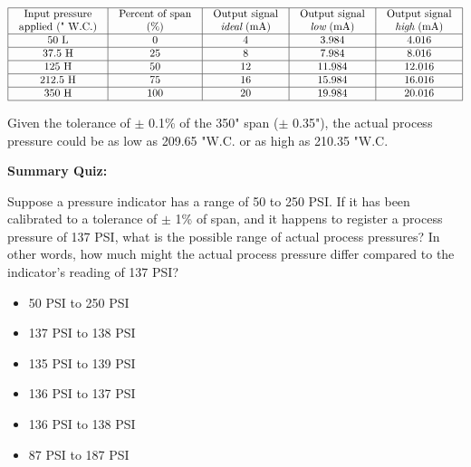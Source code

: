 






$$\vbox{\offinterlineskip
\halign{\strut
\vrule \quad\hfil # \ \hfil & 
\vrule \quad\hfil # \ \hfil & 
\vrule \quad\hfil # \ \hfil & 
\vrule \quad\hfil # \ \hfil & 
\vrule \quad\hfil # \ \hfil \vrule \cr
\noalign{\hrule}
%
Input pressure & Percent of span & Output signal & Output signal & Output signal \cr
%
applied (" W.C.) & (\%) & {\it ideal} (mA) & {\it low} (mA) & {\it high} (mA) \cr
%
\noalign{\hrule}
%
50 L & 0 & 4 & 3.984 & 4.016 \cr
%
\noalign{\hrule}
%
37.5 H & 25 & 8 & 7.984 & 8.016 \cr
%
\noalign{\hrule}
%
125 H & 50 & 12 & 11.984 & 12.016 \cr
%
\noalign{\hrule}
%
212.5 H & 75 & 16 & 15.984 & 16.016 \cr
%
\noalign{\hrule}
%
350 H & 100 & 20 & 19.984 & 20.016 \cr
%
\noalign{\hrule}
} %
}$$ %


Given the tolerance of $\pm$ 0.1\% of the 350" span ($\pm$ 0.35"), the actual process pressure could be as low as 209.65 "W.C. or as high as 210.35 "W.C.














\vfil \eject

\noindent
{\bf Summary Quiz:}

Suppose a pressure indicator has a range of 50 to 250 PSI.  If it has been calibrated to a tolerance of $\pm$ 1\% of span, and it happens to register a process pressure of 137 PSI, what is the possible range of actual process pressures?  In other words, how much might the actual process pressure differ compared to the indicator's reading of 137 PSI?

\begin{itemize}
\item{} 50 PSI to 250 PSI
\vskip 5pt 
\item{} 137 PSI to 138 PSI
\vskip 5pt 
\item{} 135 PSI to 139 PSI
\vskip 5pt 
\item{} 136 PSI to 137 PSI
\vskip 5pt 
\item{} 136 PSI to 138 PSI
\vskip 5pt 
\item{} 87 PSI to 187 PSI
\end{itemize}




